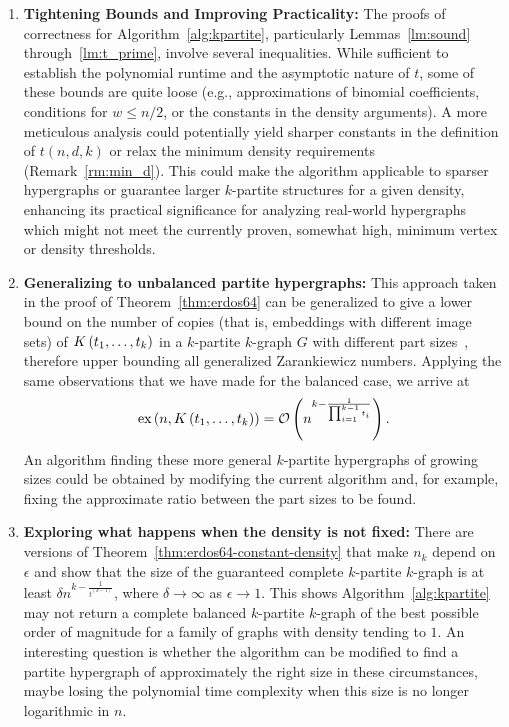 \begin{enumerate}
    \item \textbf{Tightening Bounds and Improving Practicality:}
    The proofs of correctness for Algorithm~\ref{alg:kpartite}, particularly Lemmas~\ref{lm:sound} through~\ref{lm:t_prime},
    involve several inequalities.
    While sufficient to establish the polynomial runtime and the asymptotic nature of $t$,
    some of these bounds are quite loose (e.g., approximations of binomial coefficients, conditions for $w \leq n/2$,
    or the constants in the density arguments).
    A more meticulous analysis could potentially yield sharper constants in the definition of
    $t(n,d,k)$ or relax the minimum density requirements (Remark~\ref{rm:min_d}).
    This could make the algorithm applicable to sparser hypergraphs or guarantee larger $k$-partite structures for a given density,
    enhancing its practical significance for analyzing real-world hypergraphs which might not meet the currently proven,
    somewhat high, minimum vertex or density thresholds.

    \item \textbf{Generalizing to unbalanced partite hypergraphs:}
    This approach taken in the proof of Theorem~\ref{thm:erdos64}
    can be generalized to give a lower bound on the number of
    copies (that is, embeddings with different image sets)
    of $K\left(t_1, \dots, t_k\right)$ in a $k$-partite $k$-graph $G$
    with different part sizes~\cite{carvajal2024canonical},
    therefore upper bounding all generalized Zarankiewicz numbers.
    Applying the same observations that we have made for the balanced case,
    we arrive at
    \begin{equation} \label{eq:general-partite-bound}
        \text{ex} \left( n, K\left(t_1, \dots, t_k\right) \right) = \mathcal{O}\left(n^{k - \frac{1}{\prod_{i=1}^{k-1} t_i}}\right).
    \end{equation}
    An algorithm finding these more general $k$-partite hypergraphs
    of growing sizes could be obtained by modifying the current algorithm
    and, for example, fixing the approximate ratio between the part sizes to be found.

    \item \textbf{Exploring what happens when the density is not fixed:}
    There are versions of Theorem~\ref{thm:erdos64-constant-density}
    that make $n_k$ depend on $\epsilon$ and show that the size of the
    guaranteed complete $k$-partite $k$-graph is at least $\delta n^{k-\frac{1}{t^{(k-1)}}}$,
    where $\delta \to \infty$ as $\epsilon \to 1$.
    This shows Algorithm~\ref{alg:kpartite} may not return a complete balanced $k$-partite
    $k$-graph of the best possible order of magnitude for a family of graphs with density tending to $1$.
    An interesting question is whether the algorithm can be modified to find
    a partite hypergraph of approximately the right size in these circumstances,
    maybe losing the polynomial time complexity when this size is no longer logarithmic in $n$.


\end{enumerate}
